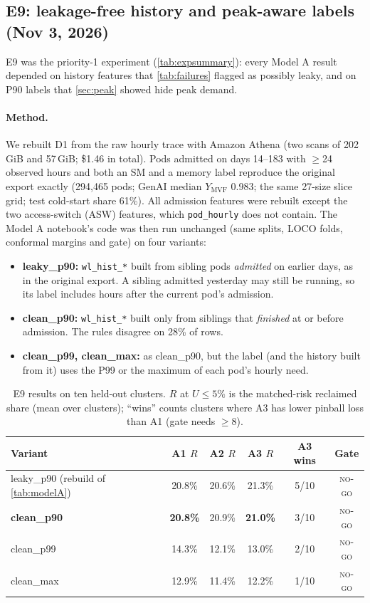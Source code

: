 \subsection{E9: leakage-free history and peak-aware labels (Nov 3, 2026)}
\label{sec:e9}

E9 was the priority-1 experiment (\cref{tab:expsummary}): every Model A result depended on history features that \cref{tab:failures} flagged as possibly leaky, and on P90 labels that \cref{sec:peak} showed hide peak demand.

\paragraph{Method.} We rebuilt D1 from the raw hourly trace with Amazon Athena (two scans of 202\,GiB and 57\,GiB; \$1.46 in total). Pods admitted on days 14--183 with $\geq$24 observed hours and both an SM and a memory label reproduce the original export exactly (294{,}465 pods; GenAI median $Y_{\text{MVF}}$ 0.983; the same 27-size slice grid; test cold-start share 61\%). All admission features were rebuilt except the two access-switch (ASW) features, which \texttt{pod\_hourly} does not contain. The Model A notebook's code was then run unchanged (same splits, LOCO folds, conformal margins and gate) on four variants:
\begin{itemize}
  \item \textbf{leaky\_p90:} \texttt{wl\_hist\_*} built from sibling pods \emph{admitted} on earlier days, as in the original export. A sibling admitted yesterday may still be running, so its label includes hours after the current pod's admission.
  \item \textbf{clean\_p90:} \texttt{wl\_hist\_*} built only from siblings that \emph{finished} at or before admission. The rules disagree on 28\% of rows.
  \item \textbf{clean\_p99, clean\_max:} as clean\_p90, but the label (and the history built from it) uses the P99 or the maximum of each pod's hourly need.
\end{itemize}

\begin{table}[h]
\centering\small
\caption{E9 results on ten held-out clusters. $R$ at $U \le 5\%$ is the matched-risk reclaimed share (mean over clusters); ``wins'' counts clusters where A3 has lower pinball loss than A1 (gate needs $\geq$8).}
\label{tab:e9}
\begin{tabular}{@{}lccccc@{}}
\toprule
Variant & A1 $R$ & A2 $R$ & A3 $R$ & A3 wins & Gate \\
\midrule
leaky\_p90 (rebuild of \cref{tab:modelA}) & 20.8\% & 20.6\% & 21.3\% & 5/10 & \textsc{no-go} \\
\textbf{clean\_p90}                        & \textbf{20.8\%} & 20.9\% & \textbf{21.0\%} & 3/10 & \textsc{no-go} \\
clean\_p99                                 & 14.3\% & 12.1\% & 13.0\% & 2/10 & \textsc{no-go} \\
clean\_max                                 & 12.9\% & 11.4\% & 12.2\% & 1/10 & \textsc{no-go} \\
\bottomrule
\end{tabular}
\end{table}

